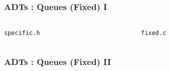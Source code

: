 
\begin{frame}[fragile]
\frametitle{ADTs : Queues (Fixed) I}
\begin{columns}[T]

\begin{column}{0.45\textwidth}
\verb^specific.h^

\end{column}

\pause
\begin{column}{0.45\textwidth}
\verb^fixed.c^

\end{column}

\end{columns}
\end{frame}


\begin{frame}[fragile]
\frametitle{ADTs : Queues (Fixed) II}
\begin{columns}[T]

\begin{column}{0.45\textwidth}

\end{column}

\pause
\begin{column}{0.45\textwidth}

\end{column}

\end{columns}
\end{frame}


